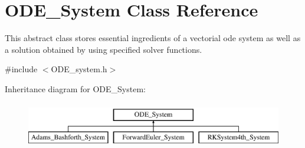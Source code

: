 \hypertarget{class_o_d_e___system}{}\section{O\+D\+E\+\_\+\+System Class Reference}
\label{class_o_d_e___system}


This abstract class stores essential ingredients of a vectorial ode system as well as a solution obtained by using specified solver functions.  




{\ttfamily \#include $<$O\+D\+E\+\_\+system.\+h$>$}

Inheritance diagram for O\+D\+E\+\_\+\+System\+:\begin{figure}[H]
\begin{center}
\leavevmode
\includegraphics[height=2.000000cm]{class_o_d_e___system}
\end{center}
\end{figure}
